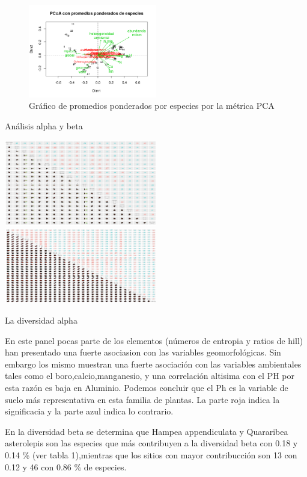 \documentclass[11pt,]{article}
\begin{document}
\begin{figure}
\centering
\includegraphics[width=0.50000\textwidth]{metrica_PCoa_con_promedio_ponderado_especies.png}
\caption{Gráfico de promedios ponderados por especies por la métrica
PCA}
\end{figure}

Análisis alpha y beta

\includegraphics[width=0.50000\textwidth]{matriz_correlacion_geomorf_abun_riq_spearman.png}
\includegraphics[width=0.50000\textwidth]{Representacion_especies_variables_ambientales.png}

La diversidad alpha

En este panel pocas parte de los elementos (números de entropia y ratios
de hill) han presentado una fuerte asociasion con las variables
geomorfológicas. Sin embargo los mismo muestran una fuerte asociación
con las variables ambientales tales como el boro,calcio,manganesio, y
una correlación altisima con el PH por esta razón es baja en Aluminio.
Podemos concluir que el Ph es la variable de suelo más representativa en
esta familia de plantas. La parte roja indica la significacia y la parte
azul indica lo contrario.

En la diversidad beta se determina que Hampea appendiculata y Quararibea
asterolepis son las especies que más contribuyen a la diversidad beta
con 0.18 y 0.14 \% (ver tabla 1),mientras que los sitios con mayor
contribucción son 13 con 0.12 y 46 con 0.86 \% de especies.
\end{document}
